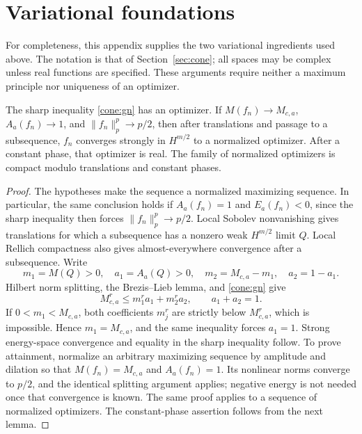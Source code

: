 \section{Variational foundations}\label{sec:foundations}

For completeness, this appendix supplies the two variational ingredients used above. The notation is that of Section~\ref{sec:cone}; all spaces may be complex unless real functions are specified. These arguments require neither a maximum principle nor uniqueness of an optimizer.


\begin{lemma}
\label{foundation:compact}
The sharp inequality \eqref{cone:gn} has an optimizer.
If $M(f_n)\to M_{c,a}$, $A_a(f_n)\to1$, and $\|f_n\|_p^p\to p/2$,
then after translations and passage to a subsequence,
$f_n$ converges strongly in $H^{m/2}$ to a normalized optimizer. After a constant phase, that optimizer is real. The family of normalized optimizers is compact modulo translations and constant phases.
\end{lemma}
\begin{proof}
The hypotheses make the sequence a normalized maximizing sequence. In particular, the same conclusion holds if $A_a(f_n)=1$ and $E_a(f_n)<0$, since the sharp inequality then forces $\|f_n\|_p^p\to p/2$.
Local Sobolev nonvanishing gives translations for which a subsequence
has a nonzero weak $H^{m/2}$ limit $Q$. Local Rellich compactness
also gives almost-everywhere convergence after a subsequence.
Write
\[
 m_1=M(Q)>0,\quad a_1=A_a(Q)>0,\quad
 m_2=M_{c,a}-m_1,\quad a_2=1-a_1.
\]
Hilbert norm splitting, the Brezis--Lieb lemma, and
\eqref{cone:gn} give
\[
 M_{c,a}^r\le m_1^ra_1+m_2^ra_2,\qquad a_1+a_2=1.
\]
If $0<m_1<M_{c,a}$, both coefficients $m_j^r$ are strictly below
$M_{c,a}^r$, which is impossible. Hence $m_1=M_{c,a}$, and the
same inequality forces $a_1=1$. Strong energy-space convergence
and equality in the sharp inequality follow.
To prove attainment, normalize an arbitrary maximizing sequence
by amplitude and dilation so that $M(f_n)=M_{c,a}$ and
$A_a(f_n)=1$. Its nonlinear norms converge to $p/2$, and the
identical splitting argument applies; negative energy is not
needed once that convergence is known. The same proof applies to a sequence of normalized optimizers. The constant-phase assertion follows from the next lemma.
\end{proof}

